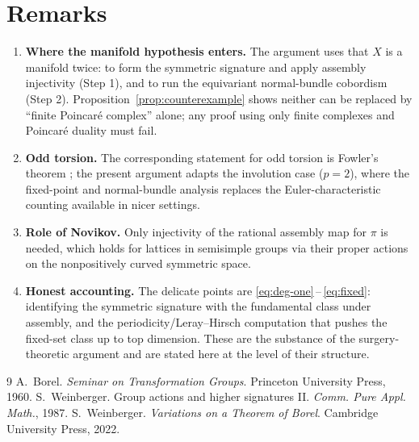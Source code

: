 \documentclass[11pt]{article}
\begin{document}
\section*{Remarks}

\begin{enumerate}\setlength\itemsep{4pt}
\item \textbf{Where the manifold hypothesis enters.} The argument uses that $X$
is a manifold twice: to form the symmetric signature and apply assembly
injectivity (Step 1), and to run the equivariant normal-bundle cobordism (Step
2). Proposition~\ref{prop:counterexample} shows neither can be replaced by
``finite Poincar\'e complex'' alone; any proof using only finite complexes and
Poincar\'e duality must fail.
\item \textbf{Odd torsion.} The corresponding statement for odd torsion is
Fowler's theorem \cite{W2}; the present argument adapts the involution case
($p=2$), where the fixed-point and normal-bundle analysis replaces the
Euler-characteristic counting available in nicer settings.
\item \textbf{Role of Novikov.} Only injectivity of the rational assembly map
for $\pi$ is needed, which holds for lattices in semisimple groups via their
proper actions on the nonpositively curved symmetric space.
\item \textbf{Honest accounting.} The delicate points are
\eqref{eq:deg-one}\,--\,\eqref{eq:fixed}: identifying the symmetric signature with
the fundamental class under assembly, and the periodicity/Leray--Hirsch
computation that pushes the fixed-set class up to top dimension. These are the
substance of the surgery-theoretic argument and are stated here at the level of
their structure.
\end{enumerate}

\begin{thebibliography}{9}
 A.~Borel.
  \emph{Seminar on Transformation Groups}. Princeton University Press, 1960.
 S.~Weinberger.
  Group actions and higher signatures II.
  \emph{Comm. Pure Appl. Math.}, 1987.
 S.~Weinberger.
  \emph{Variations on a Theorem of Borel}.
  Cambridge University Press, 2022.
\end{thebibliography}

\endgroup

\clearpage
\end{document}
